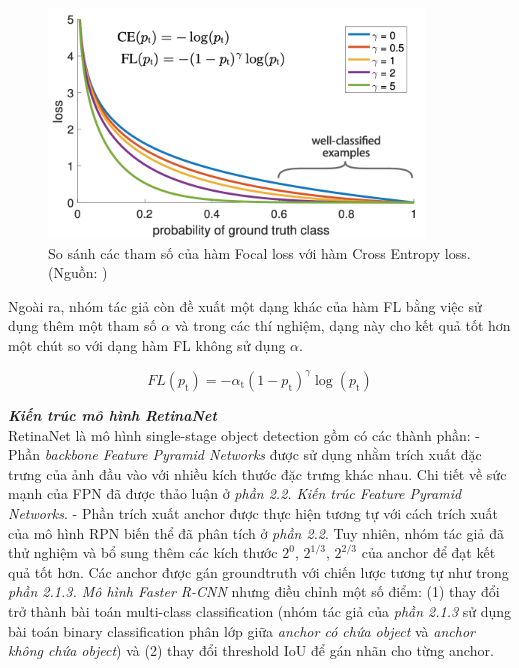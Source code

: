 {    \begin{figure}[H]
        \centering
        \includegraphics[width=10cm] {images/retinanet_focal_loss_curve}
        \caption{So sánh các tham số của hàm Focal loss với hàm Cross Entropy loss. (Nguồn: \cite{lin2017focal})}
        \label{fig:retinanet_focal_loss_curve}
    \end{figure}

    \noindent
    Ngoài ra, nhóm tác giả còn đề xuất một dạng khác của hàm FL bằng việc sử dụng thêm một tham số $\alpha$ và trong các thí nghiệm, dạng này cho kết quả tốt hơn một chút so với dạng hàm FL không sử dụng $\alpha$.

    \begin{equation}
        FL(p_\textrm{t}) = - \alpha_\textrm{t} (1 - p_\textrm{t})^\gamma \log (p_\textrm{t})
    \end{equation}
    
    \noindent
    \textbf{\textit{Kiến trúc mô hình RetinaNet}} \\
    RetinaNet là mô hình single-stage object detection gồm có các thành phần:
    - Phần \textit{backbone Feature Pyramid Networks} được sử dụng nhằm trích xuất đặc trưng của ảnh đầu vào với nhiều kích thước đặc trưng khác nhau.
    Chi tiết về sức mạnh của FPN đã được thảo luận ở \textit{phần 2.2. Kiến trúc Feature Pyramid Networks}.
    - Phần trích xuất anchor được thực hiện tương tự với cách trích xuất của mô hình RPN biến thể đã phân tích ở \textit{phần 2.2}.
    Tuy nhiên, nhóm tác giả đã thử nghiệm và bổ sung thêm các kích thước $2^{0}$, $2^{1/3}$, $2^{2/3}$ của anchor để đạt kết quả tốt hơn.
    Các anchor được gán groundtruth với chiến lược tương tự như trong \textit{phần 2.1.3. Mô hình Faster R-CNN} nhưng điều chỉnh một số điểm: (1) thay đổi trở thành bài toán multi-class classification (nhóm tác giả của \textit{phần 2.1.3} sử dụng bài toán binary classification phân lớp giữa \textit{anchor có chứa object} và \textit{anchor không chứa object}) và (2) thay đổi threshold IoU để gán nhãn cho từng anchor.

}
